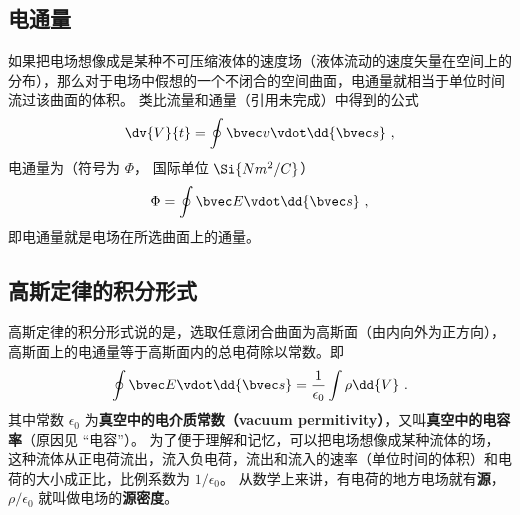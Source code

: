 \subsection{电通量}
如果把电场想像成是某种不可压缩液体的速度场（液体流动的速度矢量在空间上的分布），那么对于电场中假想的一个不闭合的空间曲面，电通量就相当于单位时间流过该曲面的体积。
类比流量和通量（引用未完成）中得到的公式
\begin{equation}
\dv{V}{t} = \oint \bvec v \vdot \dd{\bvec s}~,
\end{equation} 
电通量为（符号为 $\Phi $， 国际单位 $\Si{N m^2/C}$）
\begin{equation}
\Phi  = \oint \bvec E \vdot \dd{\bvec s}~,
\end{equation} 
即电通量就是电场在所选曲面上的通量。

\subsection{高斯定律的积分形式}

高斯定律的积分形式说的是，选取任意闭合曲面为高斯面（由内向外为正方向），高斯面上的电通量等于高斯面内的总电荷除以常数。即
\begin{equation}\label{eq_EGauss_5}
\oint \bvec E \vdot \dd{\bvec s}  = \frac{1}{\epsilon_0} \int \rho \dd{V}~.
\end{equation} 
其中常数 $\epsilon_0$ 为\textbf{真空中的电介质常数（vacuum permitivity）}，又叫\textbf{真空中的电容率}（原因见 “电容”）。 为了便于理解和记忆，可以把电场想像成某种流体的场，这种流体从正电荷流出，流入负电荷，流出和流入的速率（单位时间的体积）和电荷的大小成正比，比例系数为 $1/\epsilon_0$。 从数学上来讲，有电荷的地方电场就有\textbf{源}， $\rho /\epsilon_0$ 就叫做电场的\textbf{源密度}。

